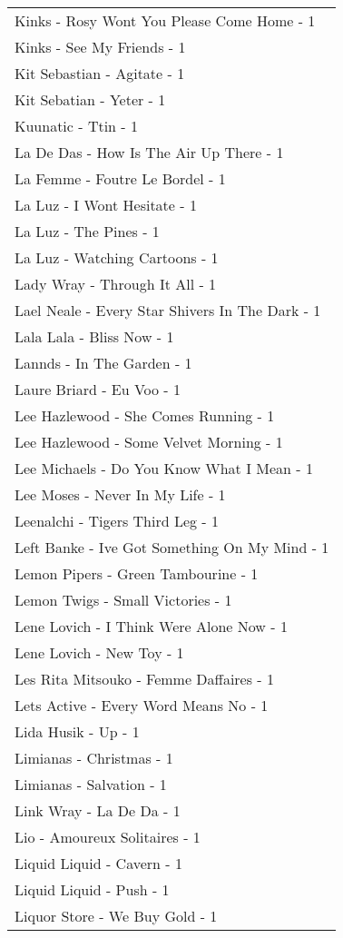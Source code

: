 \documentclass[
]{article}
\begin{document}
\begin{longtable}{l}
Kinks - Rosy Wont You Please Come Home - 1 \\ 
Kinks - See My Friends - 1 \\ 
Kit Sebastian - Agitate - 1 \\ 
Kit Sebatian - Yeter - 1 \\ 
Kuunatic - Ttin - 1 \\ 
La De Das - How Is The Air Up There - 1 \\ 
La Femme - Foutre Le Bordel - 1 \\ 
La Luz - I Wont Hesitate - 1 \\ 
La Luz - The Pines - 1 \\ 
La Luz - Watching Cartoons - 1 \\ 
Lady Wray - Through It All - 1 \\ 
Lael Neale - Every Star Shivers In The Dark - 1 \\ 
Lala Lala - Bliss Now - 1 \\ 
Lannds - In The Garden - 1 \\ 
Laure Briard - Eu Voo - 1 \\ 
Lee Hazlewood - She Comes Running - 1 \\ 
Lee Hazlewood - Some Velvet Morning - 1 \\ 
Lee Michaels - Do You Know What I Mean - 1 \\ 
Lee Moses - Never In My Life - 1 \\ 
Leenalchi - Tigers Third Leg - 1 \\ 
Left Banke - Ive Got Something On My Mind - 1 \\ 
Lemon Pipers - Green Tambourine - 1 \\ 
Lemon Twigs - Small Victories - 1 \\ 
Lene Lovich - I Think Were Alone Now - 1 \\ 
Lene Lovich - New Toy - 1 \\ 
Les Rita Mitsouko - Femme Daffaires - 1 \\ 
Lets Active - Every Word Means No - 1 \\ 
Lida Husik - Up - 1 \\ 
Limianas - Christmas - 1 \\ 
Limianas - Salvation - 1 \\ 
Link Wray - La De Da - 1 \\ 
Lio - Amoureux Solitaires - 1 \\ 
Liquid Liquid - Cavern - 1 \\ 
Liquid Liquid - Push - 1 \\ 
Liquor Store - We Buy Gold - 1 \\ 

\end{longtable}
\end{document}

